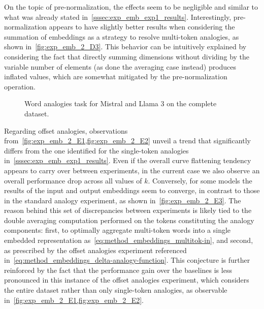 On the topic of pre-normalization, the effects seem to be negligible and similar to what was already stated in~\cref{sssec:exp_emb_exp1_results}.
Interestingly, pre-normalization appears to have slightly better results when considering the summation of embeddings as a strategy to resolve multi-token analogies, as shown in~\cref{fig:exp_emb_2_D3}.
This behavior can be intuitively explained by considering the fact that directly summing dimensions without dividing by the variable number of elements (as done the averaging case instead) produces inflated values, which are somewhat mitigated by the pre-normalization operation.

\begin{figure}[t!]
    \centering
    \quad
    \begingroup
    \captionsetup{width=0.9\textwidth/2}
    \endgroup
    \caption{Word analogies task for Mistral and Llama 3 on the complete dataset.}
    \label{fig:exp_emb_2_D}
\end{figure}

Regarding offset analogies, observations from~\cref{fig:exp_emb_2_E1,fig:exp_emb_2_E2} unveil a trend that significantly differs from the one identified for the single-token analogies in~\cref{sssec:exp_emb_exp1_results}.
Even if the overall curve flattening tendency appears to carry over between experiments, in the current case we also observe an overall performance drop across all values of $k$.
Conversely, for some models the results of the input and output embeddings seem to converge, in contrast to those in the standard analogy experiment, as shown in~\cref{fig:exp_emb_2_E3}.
The reason behind this set of discrepancies between experiments is likely tied to the double averaging computation performed on the tokens constituting the analogy components: first, to optimally aggregate multi-token words into a single embedded representation as~\cref{eq:method_embeddings_multitok-in}, and second, as prescribed by the offset analogies experiment referenced in~\cref{eq:method_embeddings_delta-analogy-function}.
This conjecture is further reinforced by the fact that the performance gain over the baselines is less pronounced in this instance of the offset analogies experiment, which considers the entire dataset rather than only single-token analogies, as observable in~\cref{fig:exp_emb_2_E1,fig:exp_emb_2_E2}.

